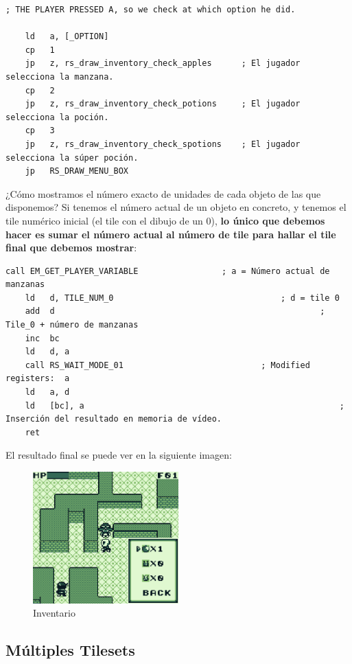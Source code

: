 \begin{lstlisting}[caption={Comprobación de Objeto Seleccionado}, label={code:selectedobj}]
	; THE PLAYER PRESSED A, so we check at which option he did.

	ld 	 a, [_OPTION]
	cp 	 1
	jp 	 z, rs_draw_inventory_check_apples 		; El jugador selecciona la manzana.
	cp   2
	jp 	 z, rs_draw_inventory_check_potions 	; El jugador selecciona la poción.
	cp 	 3
	jp 	 z, rs_draw_inventory_check_spotions 	; El jugador selecciona la súper poción.
	jp 	 RS_DRAW_MENU_BOX
\end{lstlisting}

\clearpage

¿Cómo mostramos el número exacto de unidades de cada objeto de las que disponemos? Si tenemos el número actual de un objeto en concreto, y tenemos el tile numérico inicial (el tile con el dibujo de un 0), \textbf{lo único que debemos hacer es sumar el número actual al número de tile para hallar el tile final que debemos mostrar}:

\begin{lstlisting}[caption={Muestreo}, label={code:selectedobj}]
	call EM_GET_PLAYER_VARIABLE 				; a = Número actual de manzanas
	ld 	 d, TILE_NUM_0 									; d = tile 0
	add  d												 	 	; Tile_0 + número de manzanas
	inc  bc
	ld 	 d, a
	call RS_WAIT_MODE_01 							; Modified registers:  a
	ld 	 a, d
	ld 	 [bc], a 													; Inserción del resultado en memoria de vídeo.
	ret
\end{lstlisting}

El resultado final se puede ver en la siguiente imagen:

\begin{figure}[h]
\centering
\includegraphics[width=0.5\textwidth]{include/images/desarrollo/Inventory.png}
\caption{Inventario}
\label{figure:inventory}
\end{figure}

\subsection{Múltiples Tilesets}

